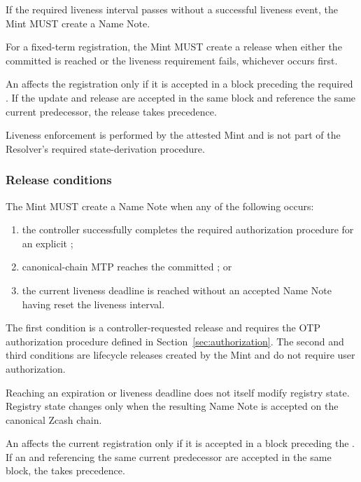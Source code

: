 If the required liveness interval passes without a successful liveness event, the Mint MUST create a  Name Note.

For a fixed-term registration, the Mint MUST create a release when either the committed  is reached or the liveness requirement fails, whichever occurs first.

An  affects the registration only if it is accepted in a block preceding the required . If the update and release are accepted in the same block and reference the same current predecessor, the release takes precedence.

Liveness enforcement is performed by the attested Mint and is not part of the Resolver's required state-derivation procedure.

\subsubsection{Release conditions}

The Mint MUST create a  Name Note when any of the following occurs:

\begin{enumerate}
  \item the controller successfully completes the required authorization procedure for an explicit ;
  \item canonical-chain MTP reaches the committed ; or
  \item the current liveness deadline is reached without an accepted  Name Note having reset the liveness interval.
\end{enumerate}

The first condition is a controller-requested release and requires the OTP authorization procedure defined in Section~\ref{sec:authorization}. The second and third conditions are lifecycle releases created by the Mint and do not require user authorization.

Reaching an expiration or liveness deadline does not itself modify registry state. Registry state changes only when the resulting  Name Note is accepted on the canonical Zcash chain.

An  affects the current registration only if it is accepted in a block preceding the . If an  and  referencing the same current predecessor are accepted in the same block, the  takes precedence.

